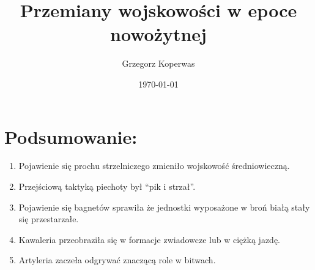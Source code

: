 \documentclass[a4paper,12pt]{article}
\title{Przemiany wojskowości w epoce nowożytnej}
\author{Grzegorz Koperwas}
\date{\today{}}
\begin{document}
	
\maketitle
\section*{Podsumowanie:}
\begin{enumerate}
	\item Pojawienie się prochu strzelniczego zmieniło wojskowość średniowieczną.
	\item Przejściową taktyką piechoty był “pik i strzał”.
	\item Pojawienie się bagnetów sprawiła że jednostki wyposażone w broń białą stały się przestarzałe.
	\item Kawaleria przeobraziła się w formacje zwiadowcze lub w ciężką jazdę.
	\item Artyleria zaczeła odgrywać znaczącą role w bitwach.
\end{enumerate}
\end{document}
